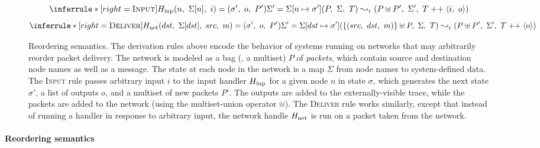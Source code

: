 \begin{figure}[t]
  \centering

  \begin{footnotesize} \begin{spacing}{1.5} \[
    \inferrule*[right=\textsc{Input}]{
      \fHinp(n,\ \Sigma[n],\ i) = (\sigma',\ o,\ P') \\
      \Sigma' = \Sigma[n \mapsto \sigma']
    }{
      (P,\ \Sigma,\ T) \fastep (P \uplus P',\ \Sigma',\ T \appop \traceelt{i,\ o})
    }
  \]\[
    \inferrule*[right=\textsc{Deliver}]{
      \fHnet(dst,\ \Sigma[dst],\ src,\ m) = (\sigma',\ o,\ P') \\
      \Sigma' = \Sigma[dst \mapsto \sigma']
    }{
      (\{(src,\ dst,\ m)\} \uplus P,\ \Sigma,\ T) \fastep (P \uplus P',\ \Sigma',\ T \appop \traceelt{o})
    }
  \] \end{spacing} \end{footnotesize}

  \caption{Reordering semantics.
  The derivation rules above encode the behavior of systems running on
  networks that may arbitrarily reorder packet delivery.
  The network is modeled as a bag (\ie, a multiset) $P$ of \textit{packets}, which
  contain source and destination node names as well as a message.
  The state at each node in the network is a map
  $\Sigma$ from node names to system-defined data.
  The \textsc{Input} rule passes arbitrary input $i$
  to the input handler $H_{\mathrm{inp}}$ for a given node $n$ in state
  $\sigma$, which generates the next state $\sigma'$, a list of
  outputs $o$, and a multiset of new packets $P'$. The outputs are
  added to the externally-visible trace, while the packets are added
  to the network (using the multiset-union operator $\uplus$).
  The \textsc{Deliver} rule works similarly, except that instead of
  running a handler in response to arbitrary input, the network handle
  $H_{\mathrm{net}}$ is run on a packet taken from the network.
}
\label{fig:async-semantics}
\end{figure}

\paragraph{Reordering semantics}

